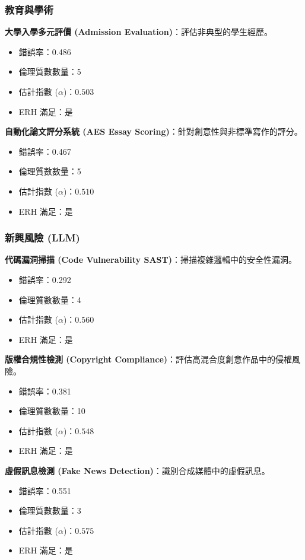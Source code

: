 \documentclass[12pt,a4paper]{article}
\theoremstyle{definition}
\theoremstyle{remark}
\begin{document}
\subsubsection{教育與學術}

\textbf{大學入學多元評價 (Admission Evaluation)}：評估非典型的學生經歷。
\begin{itemize}
    \item 錯誤率：0.486
    \item 倫理質數數量：5
    \item 估計指數 ($\alpha$)：$0.503$
    \item ERH 滿足：是
\end{itemize}

\textbf{自動化論文評分系統 (AES Essay Scoring)}：針對創意性與非標準寫作的評分。
\begin{itemize}
    \item 錯誤率：0.467
    \item 倫理質數數量：5
    \item 估計指數 ($\alpha$)：$0.510$
    \item ERH 滿足：是
\end{itemize}

\subsubsection{新興風險 (LLM)}

\textbf{代碼漏洞掃描 (Code Vulnerability SAST)}：掃描複雜邏輯中的安全性漏洞。
\begin{itemize}
    \item 錯誤率：0.292
    \item 倫理質數數量：4
    \item 估計指數 ($\alpha$)：$0.560$
    \item ERH 滿足：是
\end{itemize}

\textbf{版權合規性檢測 (Copyright Compliance)}：評估高混合度創意作品中的侵權風險。
\begin{itemize}
    \item 錯誤率：0.381
    \item 倫理質數數量：10
    \item 估計指數 ($\alpha$)：$0.548$
    \item ERH 滿足：是
\end{itemize}

\textbf{虛假訊息檢測 (Fake News Detection)}：識別合成媒體中的虛假訊息。
\begin{itemize}
    \item 錯誤率：0.551
    \item 倫理質數數量：3
    \item 估計指數 ($\alpha$)：$0.575$
    \item ERH 滿足：是
\end{itemize}
\end{document}
